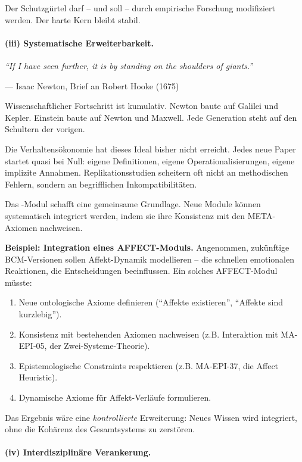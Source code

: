 Der Schutzgürtel darf -- und soll -- durch empirische Forschung modifiziert werden. Der harte Kern bleibt stabil.

\paragraph{(iii) Systematische Erweiterbarkeit.}

\epigraph{\textit{``If I have seen further, it is by standing on the shoulders of giants.''}}{--- Isaac Newton, Brief an Robert Hooke (1675)}

Wissenschaftlicher Fortschritt ist kumulativ. Newton baute auf Galilei und Kepler. Einstein baute auf Newton und Maxwell. Jede Generation steht auf den Schultern der vorigen.

Die Verhaltensökonomie hat dieses Ideal bisher nicht erreicht. Jedes neue Paper startet quasi bei Null: eigene Definitionen, eigene Operationalisierungen, eigene implizite Annahmen. Replikationsstudien scheitern oft nicht an methodischen Fehlern, sondern an begrifflichen Inkompatibilitäten.

Das \META-Modul schafft eine gemeinsame Grundlage. Neue Module können systematisch integriert werden, indem sie ihre Konsistenz mit den META-Axiomen nachweisen.

\textbf{Beispiel: Integration eines AFFECT-Moduls.} Angenommen, zukünftige BCM-Versionen sollen Affekt-Dynamik modellieren -- die schnellen emotionalen Reaktionen, die Entscheidungen beeinflussen. Ein solches AFFECT-Modul müsste:
\begin{enumerate}
    \item Neue ontologische Axiome definieren (``Affekte existieren'', ``Affekte sind kurzlebig'').
    \item Konsistenz mit bestehenden Axiomen nachweisen (z.B. Interaktion mit MA-EPI-05, der Zwei-Systeme-Theorie).
    \item Epistemologische Constraints respektieren (z.B. MA-EPI-37, die Affect Heuristic).
    \item Dynamische Axiome für Affekt-Verläufe formulieren.
\end{enumerate}

Das Ergebnis wäre eine \textit{kontrollierte} Erweiterung: Neues Wissen wird integriert, ohne die Kohärenz des Gesamtsystems zu zerstören.

\paragraph{(iv) Interdisziplinäre Verankerung.}


